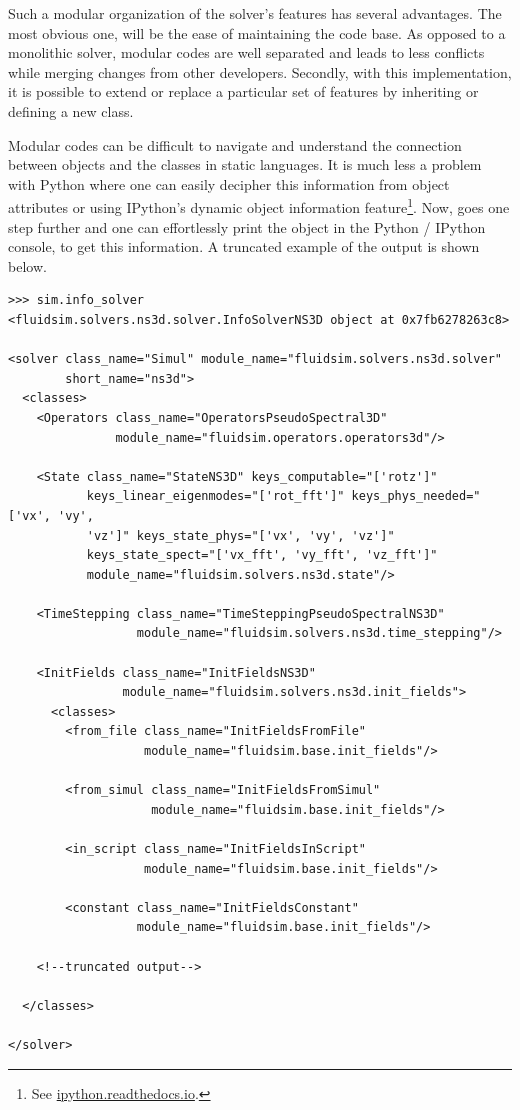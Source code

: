 Such a modular organization of the solver's features has several advantages.
The most obvious one, will be the ease of maintaining the code base. As opposed
to a monolithic solver, modular codes are well separated and leads to less
conflicts while merging changes from other developers. Secondly, with this
implementation, it is possible to extend or replace a particular set of
features by inheriting or defining a new class.

Modular codes can be difficult to navigate and understand the connection between
objects and the classes in static languages. It is much less a problem with
Python where one can easily decipher this information from object attributes or
using IPython's dynamic object information feature\footnote{See
\href{https://ipython.readthedocs.io/en/stable/interactive/%
reference.html\#dynamic-object-information}{ipython.readthedocs.io}.}.
%
Now,  goes one step further and one can effortlessly print the
 object in the Python / IPython console, to get this
information.  A truncated example of the output is shown below.

\begin{verbatim}
>>> sim.info_solver
<fluidsim.solvers.ns3d.solver.InfoSolverNS3D object at 0x7fb6278263c8>

<solver class_name="Simul" module_name="fluidsim.solvers.ns3d.solver"
        short_name="ns3d">
  <classes>
    <Operators class_name="OperatorsPseudoSpectral3D"
               module_name="fluidsim.operators.operators3d"/>

    <State class_name="StateNS3D" keys_computable="['rotz']"
           keys_linear_eigenmodes="['rot_fft']" keys_phys_needed="['vx', 'vy',
           'vz']" keys_state_phys="['vx', 'vy', 'vz']"
           keys_state_spect="['vx_fft', 'vy_fft', 'vz_fft']"
           module_name="fluidsim.solvers.ns3d.state"/>

    <TimeStepping class_name="TimeSteppingPseudoSpectralNS3D"
                  module_name="fluidsim.solvers.ns3d.time_stepping"/>

    <InitFields class_name="InitFieldsNS3D"
                module_name="fluidsim.solvers.ns3d.init_fields">
      <classes>
        <from_file class_name="InitFieldsFromFile"
                   module_name="fluidsim.base.init_fields"/>

        <from_simul class_name="InitFieldsFromSimul"
                    module_name="fluidsim.base.init_fields"/>

        <in_script class_name="InitFieldsInScript"
                   module_name="fluidsim.base.init_fields"/>

        <constant class_name="InitFieldsConstant"
                  module_name="fluidsim.base.init_fields"/>

	<!--truncated output-->

  </classes>

</solver>
\end{verbatim}

